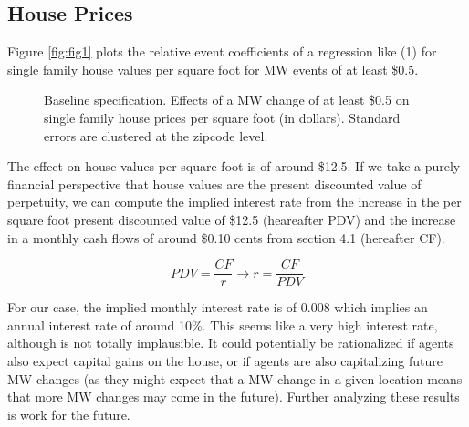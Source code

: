 \subsection{House Prices}

Figure \ref{fig:fig1} plots the relative event coefficients of a regression like (1) for single family house values per square foot for MW events of at least \$0.5. 

\begin{figure}[h!]
    \centering
    \caption{Baseline specification. Effects of a MW change of at least \$0.5 on single family house prices per square foot (in dollars). Standard errors are clustered at the zipcode level.}
    \label{fig:fig4}
\end{figure}

The effect on house values per square foot is of around \$12.5. If we take a purely financial perspective that house values are the present discounted value of perpetuity, we can compute the implied interest rate from the increase in the per square foot present discounted value of \$12.5 (heareafter PDV) and the increase in a monthly cash flows of around \$0.10 cents from section 4.1 (hereafter CF).

\begin{equation}
    PDV = \frac{CF}{r} \to r = \frac{CF}{PDV}
\end{equation}

For our case, the implied monthly interest rate is of 0.008 which implies an annual interest rate of around 10\%. This seems like a very high interest rate, although is not totally implausible. It could potentially be rationalized if agents also expect capital gains on the house, or if agents are also capitalizing future MW changes (as they might expect that a MW change in a given location means that more MW changes may come in the future). Further analyzing these results is work for the future. 
